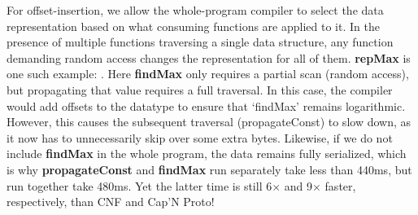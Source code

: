 For offset-insertion, we allow the whole-program compiler to select the data
representation based on what consuming functions are applied to it.
In the presence of multiple functions traversing a single data structure,
any function demanding random access changes the representation for all of them.
{\bf repMax} is one such example:
.
Here {\bf findMax} only requires a partial scan (random access), but propagating
that value requires a full traversal.  In this case, the compiler would add
offsets to the datatype to ensure that `findMax' remains
logarithmic.
%
However, this causes the subsequent traversal (propagateConst) to slow
down, as it now has to unnecessarily skip over some extra bytes.  Likewise, if
we do not include {\bf findMax} in the whole program, the data remains fully
serialized, which is why {\bf propagateConst} and {\bf findMax} run separately
take less than 440ms, but run together take 480ms.  Yet the latter time is still
6$\times$ and 9$\times$ faster, respectively, than CNF and Cap'N Proto!



